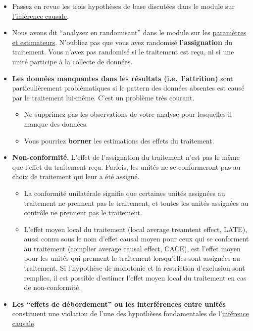 \documentclass[
  12pt,
]{book}
\begin{document}
\begin{itemize}
\item
  Passez en revue les trois hypothèses de base discutées dans le module sur \href{inférence-causale.html}{l'inférence causale}.
\item
  Nous avons dit ``analysez en randomisant'' dans le module sur les \href{paramètres-et-estimateurs.html}{paramètres et estimateurs}. N'oubliez pas que vous avez randomisé \textbf{l'assignation} du traitement. Vous n'avez pas randomisé si le traitement est reçu, ni si une unité participe à la collecte de données.
\item
  \textbf{Les données manquantes dans les résultats (i.e.~l'attrition)} sont particulièrement problématiques si le pattern des données absentes est causé par le traitement lui-même. C'est un problème très courant.

  \begin{itemize}
  \item
    Ne supprimez pas les observations de votre analyse pour lesquelles il manque des données.
  \item
    Vous pourriez \textbf{borner} les estimations des effets du traitement.
  \end{itemize}
\item
  \textbf{Non-conformité}. L'effet de l'assignation du traitement n'est pas le même que l'effet du traitement reçu. Parfois, les unités ne se conformeront pas au choix de traitement qui leur a été assigné.

  \begin{itemize}
  \item
    La conformité unilatérale signifie que certaines unités assignées au traitement ne prennent pas le traitement, et toutes les unités assignées au contrôle ne prennent pas le traitement.
  \item
    L'effet moyen local du traitement (local average treamtent effect, LATE), aussi connu sous le nom d'effet causal moyen pour ceux qui se conforment au traitement (complier average causal effect, CACE), est l'effet moyen pour les unités qui prennent le traitement lorsqu'elles sont assignées au traitement. Si l'hypothèse de monotonie et la restriction d'exclusion sont remplies, il est possible d'estimer l'effet moyen local du traitement en cas de non-conformité.
  \end{itemize}
\item
  \textbf{Les ``effets de débordement'' ou les interférences entre unités} constituent une violation de l'une des hypothèses fondamentales de l'\href{inférence-causale.html}{inférence causale}.


\end{itemize}
\end{document}
